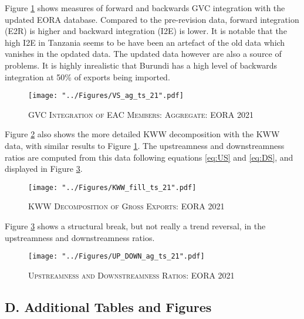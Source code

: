 \documentclass[a4paper]{article}
\begin{document}
Figure \ref{fig:VSag_ts_21} shows measures of forward and backwards GVC integration with the updated EORA database. Compared to the pre-revision data, forward integration (E2R) is higher and backward integration (I2E) is lower. It is notable that the high I2E in Tanzania seems to be have been an artefact of the old data which vanishes in the opdated data. The updated data however are also a source of problems. It is highly inrealistic that Burundi has a high level of backwards integration at 50\% of exports being imported. 

\begin{figure}[h!]
\centering
\caption{\label{fig:VSag_ts_21}\textsc{GVC Integration of EAC Members: Aggregate: EORA 2021}}
\texttt{[image: "../Figures/VS\_ag\_ts\_21".pdf]} %
\end{figure}
\FloatBarrier

Figure \ref{fig:KWW_fill_ts_21} also shows the more detailed KWW decomposition with the KWW data, with similar results to Figure \ref{fig:VSag_ts_21}. The upstreamness and downstreamness ratios are computed from this data following equations \ref{eq:US} and \ref{eq:DS}, and displayed in Figure \ref{fig:UP_DOWN_ag_ts_21}.


\begin{figure}[h!]
\centering
\caption{\label{fig:KWW_fill_ts_21}\textsc{KWW Decomposition of Gross Exports: EORA 2021}}
\texttt{[image: "../Figures/KWW\_fill\_ts\_21".pdf]} %
\end{figure}
\FloatBarrier

Figure \ref{fig:UP_DOWN_ag_ts_21} shows a structural break, but not really a trend reversal, in the upstreamness and downstreamness ratios. 

\begin{figure}[h!] %
\centering
\caption{\label{fig:UP_DOWN_ag_ts_21}\textsc{Upstreamness and Downstreamness Ratios: EORA 2021}}
\texttt{[image: "../Figures/UP\_DOWN\_ag\_ts\_21".pdf]} %
\end{figure} 
\FloatBarrier 


\subsection*{D. Additional Tables and Figures}
\setcounter{table}{0}
\renewcommand{\thetable}{D\arabic{table}}
\setcounter{figure}{0}
\renewcommand{\thefigure}{D\arabic{figure}}
\end{document}
